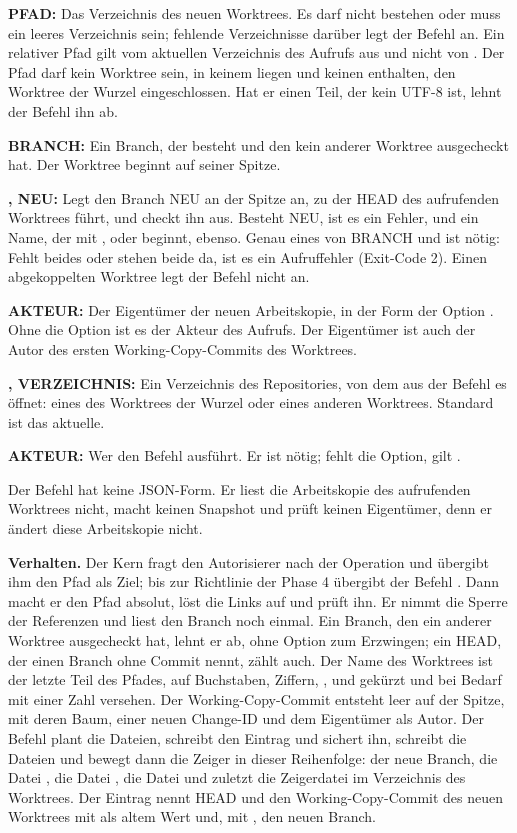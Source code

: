 \startitemize
\item {\bf PFAD:} Das Verzeichnis des neuen Worktrees. Es darf nicht bestehen oder muss ein leeres
Verzeichnis sein; fehlende Verzeichnisse darüber legt der Befehl an. Ein relativer Pfad gilt vom
aktuellen Verzeichnis des Aufrufs aus und nicht von . Der Pfad darf kein Worktree sein,
in keinem liegen und keinen enthalten, den Worktree der Wurzel eingeschlossen. Hat er einen Teil,
der kein UTF-8 ist, lehnt der Befehl ihn ab.
\item {\bf BRANCH:} Ein Branch, der besteht und den kein anderer Worktree ausgecheckt hat. Der
Worktree beginnt auf seiner Spitze.
\item {\bf {},  NEU:} Legt den Branch NEU an der Spitze an, zu der HEAD des
aufrufenden Worktrees führt, und checkt ihn aus. Besteht NEU, ist es ein Fehler, und ein Name,
der mit ,  oder  beginnt, ebenso. Genau eines von
BRANCH und  ist nötig: Fehlt beides oder stehen beide da, ist es ein Aufruffehler
(Exit-Code 2). Einen abgekoppelten Worktree legt der Befehl nicht an.
\item {\bf {} AKTEUR:} Der Eigentümer der neuen Arbeitskopie, in der Form der Option
. Ohne die Option ist es der Akteur des Aufrufs. Der Eigentümer ist auch der Autor
des ersten Working-Copy-Commits des Worktrees.
\item {\bf {},  VERZEICHNIS:} Ein Verzeichnis des Repositories, von dem
aus der Befehl es öffnet: eines des Worktrees der Wurzel oder eines anderen Worktrees. Standard ist
das aktuelle.
\item {\bf {} AKTEUR:} Wer den Befehl ausführt. Er ist nötig; fehlt die Option, gilt
.
\stopitemize

Der Befehl hat keine JSON-Form. Er liest die Arbeitskopie des aufrufenden Worktrees nicht, macht
keinen Snapshot und prüft keinen Eigentümer, denn er ändert diese Arbeitskopie nicht.

{\bf Verhalten.} Der Kern fragt den Autorisierer nach der Operation  und
übergibt ihm den Pfad als Ziel; bis zur Richtlinie der Phase 4 übergibt der Befehl
. Dann macht er den Pfad absolut, löst die Links auf und prüft ihn.
Er nimmt die Sperre der Referenzen und liest den Branch noch einmal.
Ein Branch, den ein anderer Worktree ausgecheckt hat, lehnt er ab, ohne Option zum Erzwingen;
ein HEAD, der einen Branch ohne Commit nennt, zählt auch.
Der Name des Worktrees ist der letzte Teil des Pfades, auf Buchstaben, Ziffern, \type{-},
\type{_} und  gekürzt und bei Bedarf mit einer Zahl versehen.
Der Working-Copy-Commit entsteht leer auf der Spitze, mit deren Baum, einer neuen Change-ID und
dem Eigentümer als Autor.
Der Befehl plant die Dateien, schreibt den Eintrag  und sichert ihn,
schreibt die Dateien und bewegt dann die Zeiger in dieser Reihenfolge: der neue Branch, die Datei
, die Datei , die Datei  und zuletzt die Zeigerdatei
 im Verzeichnis des Worktrees.
Der Eintrag nennt HEAD und den Working-Copy-Commit des neuen Worktrees mit \type{-} als altem Wert
und, mit , den neuen Branch.

